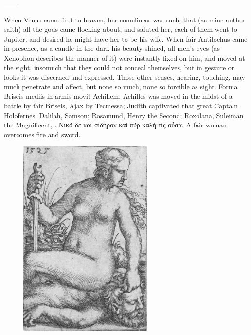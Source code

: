 ------

When Venus came first to heaven, her comeliness was such, that (as mine
author saith) all the gods came flocking about, and saluted her,
each of them went to Jupiter, and desired he might have her to be his
wife. When fair Antilochus came in presence, as a candle in the
dark his beauty shined, all men's eyes (as Xenophon describes the
manner of it) were instantly fixed on him, and moved at the sight,
insomuch that they could not conceal themselves, but in gesture or
looks it was discerned and expressed. Those other senses, hearing,
touching, may much penetrate and affect, but none so much, none so
forcible as sight. Forma Briseis mediis in armis movit Achillem,
Achilles was moved in the midst of a battle by fair Briseis, Ajax by
Tecmessa; Judith captivated that great Captain Holofernes: Dalilah,
Samson; Rosamund, Henry the Second; Roxolana, Suleiman the
Magnificent, \etc{}.
\textgreek[variant=ancient]{Νικᾶ δε καὶ σίδηρον καὶ πῦρ καλὴ τὶς οὖσα.}
A fair woman overcomes fire and sword.

\begin{figure}[tbh]
  \begingroup
  \centering
  \includegraphics[keepaspectratio,width=0.6\textwidth]{figures/pride-JudithHolofernes-small.jpg}
  \label{fig:judithholofernes}
\end{figure}

